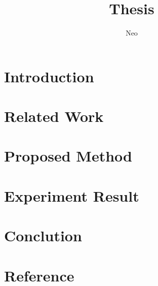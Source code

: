 \documentclass{article}
\title{Thesis}
\author{Neo}
\date{}
\begin{document}
\maketitle



\section{Introduction}


\section{Related Work}


% 

\section{Proposed Method}


\section{Experiment Result}


\section{Conclution}


\section{Reference}

% 
% 
\end{document}
